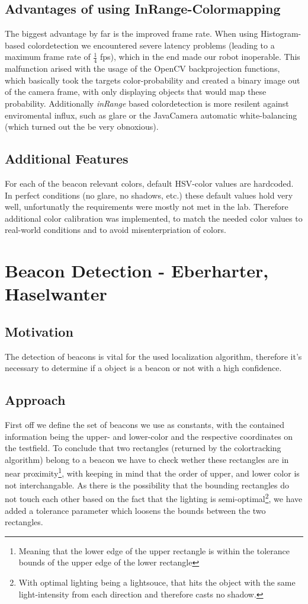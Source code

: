 \documentclass[703031]{iisreport}
\begin{document}
\subsection{Advantages of using InRange-Colormapping}
The biggest advantage by far is the improved frame rate. When using Histogram-based colordetection we encountered severe latency problems (leading to a maximum frame rate of $\frac{1}{4}$ fps), which in the end made our robot inoperable. This malfunction arised with the usage of the OpenCV backprojection functions, which basically took the targets color-probability and created a binary image out of the camera frame, with only displaying objects that would map these probability.
Additionally \emph{inRange} based colordetection is more resilent against enviromental influx, such as glare or the JavaCamera automatic white-balancing (which turned out the be very obnoxious).

\subsection{Additional Features}
For each of the beacon relevant colors, default HSV-color values are hardcoded. In perfect conditions (no glare, no shadows, etc.) these default values hold very well, unfortunatly the requirements were mostly not met in the lab. Therefore additional color calibration was implemented, to match the needed color values to real-world conditions and to avoid misenterpriation of colors.

\section{Beacon Detection - Eberharter, Haselwanter}
\subsection{Motivation}
The detection of beacons is vital for the used localization algorithm, therefore it's necessary to determine if a object is a beacon or not with a high confidence. 
\subsection{Approach}
First off we define the set of beacons we use as constants, with the contained information being the upper- and lower-color and the respective coordinates on the testfield. To conclude that two rectangles (returned by the colortracking algorithm) belong to a beacon we have to check wether these rectangles are in near proximity\footnote{Meaning that the lower edge of the upper rectangle is within the tolerance bounds of the upper edge of the lower rectangle}, with keeping in mind that the order of upper, and lower color is not interchangable. 
As there is the possibility that the bounding rectangles do not touch each other based on the fact that the lighting is semi-optimal\footnote{With optimal lighting being a lightsouce, that hits the object with the same light-intensity from each direction and therefore casts no shadow.}, we have added a tolerance parameter which loosens the bounds between the two rectangles.
\end{document}
